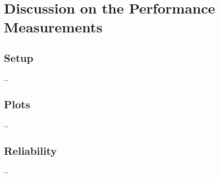 
\section{Discussion on the Performance Measurements}

\subsection{Setup}
\dots

\subsection{Plots}
\dots

\subsection{Reliability}
\dots
